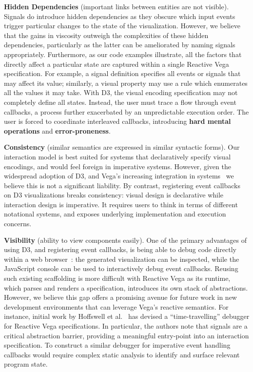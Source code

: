 \textbf{Hidden Dependencies} (important links between entities are not visible).
Signals do introduce hidden dependencies as they obscure which input events
trigger particular changes to the state of the visualization. However, we
believe that the gains in viscosity outweigh the complexities of these hidden
dependencies, particularly as the latter can be ameliorated by naming signals
appropriately. Furthermore, as our code examples illustrate, all the factors
that directly affect a particular state are captured within a single Reactive
Vega specification. For example, a signal definition specifies all events or
signals that may affect its value; similarly, a visual property may use a rule
which enumerates all the values it may take. With D3, the visual encoding
specification may not completely define all states. Instead, the user must trace
a flow through event callbacks, a process further exacerbated by an
unpredictable execution order. The user is forced to coordinate interleaved
callbacks, introducing \textbf{hard mental operations} and
\textbf{error-proneness}.

\textbf{Consistency} (similar semantics are expressed in similar syntactic
forms). Our interaction model is best suited for systems that declaratively
specify visual encodings, and would feel foreign in imperative systems. However,
given the widespread adoption of D3, and Vega's increasing integration in
systems~\cite{lyra, voyager, wikipedia:graph} we believe this is not a
significant liability. By contrast, registering event callbacks on D3
visualizations breaks consistency: visual design is declarative while
interaction design is imperative. It requires users to think in terms of
different notational systems, and exposes underlying implementation and
execution concerns.

\textbf{Visibility} (ability to view components easily). One of the primary
advantages of using D3, and registering event callbacks, is being able to debug
code directly within a web browser~\cite{bostock:d3}: the generated
visualization can be inspected, while the JavaScript console can be used to
interactively debug event callbacks. Reusing such existing scaffolding is more
difficult with Reactive Vega as its runtime, which parses and renders a
specification, introduces its own stack of abstractions. However, we believe
this gap offers a promising avenue for future work in new development
environments that can leverage Vega's reactive semantics. For instance, initial
work by Hoffswell et al.~\cite{hoffswell:debugging} has devised a
``time-travelling'' debugger for Reactive Vega specifications. In particular,
the authors note that signals are a critical abstraction barrier, providing a
meaningful entry-point into an interaction specification. To construct a similar
debugger for imperative event handling callbacks would require complex static
analysis to identify and surface relevant program state.

